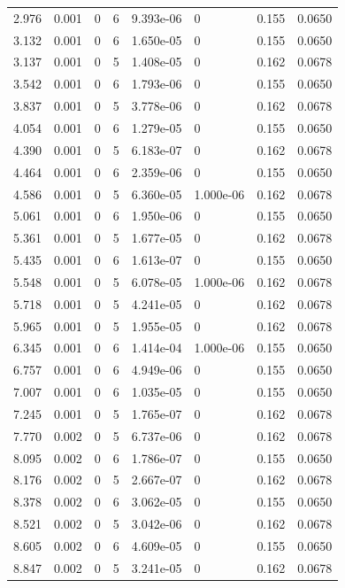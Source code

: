 \documentclass[preview]{standalone}
\begin{document}
{{\begin{tabular}{L{1.2cm}C{1.2cm} C{0.3cm}C{0.5cm} C{1.4cm}C{1.4cm} C{1.4cm}C{1.4cm}}
  2.976  &  0.001  & 0     &  6 &  9.393e-06  & 0  & 0.155 &  0.0650   \\ 
  3.132  &  0.001  & 0     &  6 &  1.650e-05  & 0  & 0.155 &  0.0650   \\ 
  3.137  &  0.001  & 0     &  5 &  1.408e-05  & 0  & 0.162 &  0.0678   \\ 
  3.542  &  0.001  & 0     &  6 &  1.793e-06  & 0  & 0.155 &  0.0650   \\ 
  3.837  &  0.001  & 0     &  5 &  3.778e-06  & 0  & 0.162 &  0.0678   \\ 
  4.054  &  0.001  & 0     &  6 &  1.279e-05  & 0  & 0.155 &  0.0650   \\ 
  4.390  &  0.001  & 0     &  5 &  6.183e-07  & 0  & 0.162 &  0.0678   \\ 
  4.464  &  0.001  & 0     &  6 &  2.359e-06  & 0  & 0.155 &  0.0650   \\ 
  4.586  &  0.001  & 0     &  5 &  6.360e-05  & 1.000e-06  & 0.162 &  0.0678   \\ 
  5.061  &  0.001  & 0     &  6 &  1.950e-06  & 0  & 0.155 &  0.0650   \\ 
  5.361  &  0.001  & 0     &  5 &  1.677e-05  & 0  & 0.162 &  0.0678   \\ 
  5.435  &  0.001  & 0     &  6 &  1.613e-07  & 0  & 0.155 &  0.0650   \\ 
  5.548  &  0.001  & 0     &  5 &  6.078e-05  & 1.000e-06  & 0.162 &  0.0678   \\ 
  5.718  &  0.001  & 0     &  5 &  4.241e-05  & 0  & 0.162 &  0.0678   \\ 
  5.965  &  0.001  & 0     &  5 &  1.955e-05  & 0  & 0.162 &  0.0678   \\ 
  6.345  &  0.001  & 0     &  6 &  1.414e-04  & 1.000e-06  & 0.155 &  0.0650   \\ 
  6.757  &  0.001  & 0     &  6 &  4.949e-06  & 0  & 0.155 &  0.0650   \\ 
  7.007  &  0.001  & 0     &  6 &  1.035e-05  & 0  & 0.155 &  0.0650   \\ 
  7.245  &  0.001  & 0     &  5 &  1.765e-07  & 0  & 0.162 &  0.0678   \\ 
  7.770  &  0.002  & 0     &  5 &  6.737e-06  & 0  & 0.162 &  0.0678   \\ 
  8.095  &  0.002  & 0     &  6 &  1.786e-07  & 0  & 0.155 &  0.0650   \\ 
  8.176  &  0.002  & 0     &  5 &  2.667e-07  & 0  & 0.162 &  0.0678   \\ 
  8.378  &  0.002  & 0     &  6 &  3.062e-05  & 0  & 0.155 &  0.0650   \\ 
  8.521  &  0.002  & 0     &  5 &  3.042e-06  & 0  & 0.162 &  0.0678   \\ 
  8.605  &  0.002  & 0     &  6 &  4.609e-05  & 0  & 0.155 &  0.0650   \\ 
  8.847  &  0.002  & 0     &  5 &  3.241e-05  & 0  & 0.162 &  0.0678   \\ 
\hline 
\end{tabular} 

}}
\end{document}
